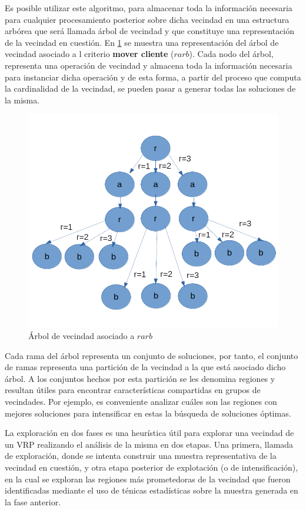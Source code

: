 Es posible utilizar este algoritmo, para almacenar toda la información
necesaria para cualquier procesamiento posterior sobre dicha vecindad en
una estructura arbórea que será llamada árbol de vecindad y que constituye
una representación de la vecindad en cuestión. En \ref{fig:neigh-tree} se muestra una representación del árbol de vecindad asociado a l criterio \textbf{mover cliente} ($rarb$). Cada nodo del árbol, representa una
operación de vecindad y almacena toda la información necesaria para instanciar dicha operación y de esta forma, a partir del proceso que computa
la cardinalidad de la vecindad, se pueden pasar a generar todas las soluciones de la misma.


\begin{figure}
	\centering
	\includegraphics[width=0.9\linewidth]{Graphics/Neigh-Tree}
	\caption{Árbol de vecindad asociado a $rarb$}
	\label{fig:neigh-tree}
\end{figure}

Cada rama del árbol representa un conjunto de soluciones, por tanto, el conjunto de ramas representa una partición de la vecindad a la que está asociado dicho árbol. A los conjuntos hechos por esta partición se les denomina regiones y resultan útiles para encontrar características compartidas en grupos de vecindades. Por ejemplo, es conveniente analizar cuáles son las regiones con mejores soluciones para intensificar en estas la búsqueda de soluciones óptimas.

La exploración en dos fases es una heurística útil para explorar una vecindad de un VRP realizando el análisis de la misma en dos etapas. Una primera, llamada de exploración, donde se intenta construir una muestra representativa de la vecindad en cuestión, y otra etapa posterior de explotación (o de intensificación), en la cual se exploran las regiones más prometedoras de la vecindad que fueron identificadas mediante el uso de ténicas estadísticas sobre la muestra generada en la fase anterior.


